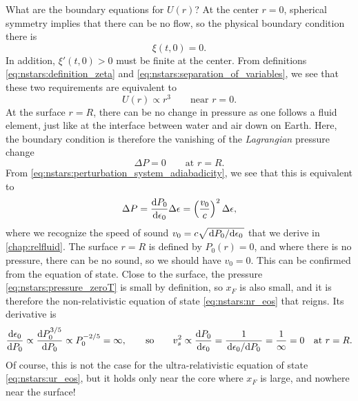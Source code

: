 What are the boundary equations for $U(r)$?
At the center $r = 0$, spherical symmetry implies that there can be no flow, so the physical boundary condition there is
\begin{equation}
	\xi(t, 0) = 0.
\label{eq:nstars:boundary_condition_center_physical}
\end{equation}
In addition, $\xi'(t,0) > 0$ must be finite at the center. \cite{ref:stability_methods}
From definitions \eqref{eq:nstars:definition_zeta} and \eqref{eq:nstars:separation_of_variables}, we see that these two requirements are equivalent to
\begin{equation}
	U(r) \propto r^3
	\qquad \text{near } r = 0.
\label{eq:nstars:boundary_condition_center_mathematical}
\end{equation}
At the surface $r = R$, there can be no change in pressure as one follows a fluid element, just like at the interface between water and air down on Earth.
Here, the boundary condition is therefore the vanishing of the \emph{Lagrangian} pressure change
\begin{equation}
	\Delta P = 0
	\qquad \text{at } r = R.
\label{eq:nstars:boundary_condition_surface_physical}
\end{equation}
From \cref{eq:nstars:perturbation_system_adiabadicity}, we see that this is equivalent to
\begin{equation}
	\Delta P = \odv{P_0}{\epsilon_0} \Delta \epsilon = \left( \frac{v_0}{c} \right)^2 \Delta\epsilon ,
\label{eq:nstars:deltaP_product}
\end{equation}
where we recognize the speed of sound $v_0 = c \sqrt{\odv{P_0}/{\epsilon_0}}$ that we derive in \cref{chap:relfluid}.
The surface $r = R$ is defined by $P_0(r) = 0$, and where there is no pressure, there can be no sound, so we should have $v_0 = 0$.
This can be confirmed from the equation of state.
Close to the surface, the pressure \eqref{eq:nstars:pressure_zeroT} is small by definition, so $x_F$ is also small, and it is therefore the non-relativistic equation of state \eqref{eq:nstars:nr_eos} that reigns.
Its derivative is
\begin{equation}
	\odv{\epsilon_0}{P_0} \propto \odv{P_0^{3/5}}{P_0} \propto P_0^{-2/5} = \infty ,
	\qquad \text{so} \qquad
	v_s^2 \propto \odv{P_0}{\epsilon_0} = \frac{1}{\odv{\epsilon_0}/{P_0}} = \frac{1}{\infty} = 0
	\quad \text{at } r = R.
\end{equation}
Of course, this is not the case for the ultra-relativistic equation of state \eqref{eq:nstars:ur_eos}, but it holds only near the core where $x_F$ is large, and nowhere near the surface!
